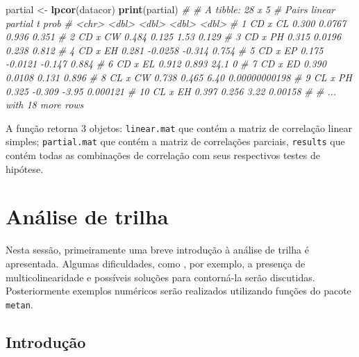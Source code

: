 \documentclass[
]{book}
\newenvironment{Shaded}{\begin{snugshade}}{\end{snugshade}}
\newcommand{\CommentTok}[1]{\textcolor[rgb]{0.56,0.35,0.01}{\textit{#1}}}
\newcommand{\KeywordTok}[1]{\textcolor[rgb]{0.13,0.29,0.53}{\textbf{#1}}}
\newcommand{\NormalTok}[1]{#1}
\newcommand{\StringTok}[1]{\textcolor[rgb]{0.31,0.60,0.02}{#1}}
\begin{document}
\begin{Shaded}
\begin{Highlighting}[]

\NormalTok{partial <-}\StringTok{ }\KeywordTok{lpcor}\NormalTok{(datacor)}
\KeywordTok{print}\NormalTok{(partial)}
\CommentTok{# # A tibble: 28 x 5}
\CommentTok{#    Pairs   linear partial      t          prob}
\CommentTok{#    <chr>    <dbl>   <dbl>  <dbl>         <dbl>}
\CommentTok{#  1 CD x CL  0.300  0.0767  0.936 0.351        }
\CommentTok{#  2 CD x CW  0.484  0.125   1.53  0.129        }
\CommentTok{#  3 CD x PH  0.315  0.0196  0.238 0.812        }
\CommentTok{#  4 CD x EH  0.281 -0.0258 -0.314 0.754        }
\CommentTok{#  5 CD x EP  0.175 -0.0121 -0.147 0.884        }
\CommentTok{#  6 CD x EL  0.912  0.893  24.1   0            }
\CommentTok{#  7 CD x ED  0.390  0.0108  0.131 0.896        }
\CommentTok{#  8 CL x CW  0.738  0.465   6.40  0.00000000198}
\CommentTok{#  9 CL x PH  0.325 -0.309  -3.95  0.000121     }
\CommentTok{# 10 CL x EH  0.397  0.256   3.22  0.00158      }
\CommentTok{# # ... with 18 more rows}
\end{Highlighting}
\end{Shaded}

A função retorna 3 objetos: \texttt{linear.mat} que contém a matriz de correlação linear simples; \texttt{partial.mat} que contém a matriz de correlações parciais, \texttt{results} que contém todas as combinações de correlação com seus respectivos testes de hipótese.

\hypertarget{anuxe1lise-de-trilha}{%
\section{Análise de trilha}\label{anuxe1lise-de-trilha}}

Nesta sessão, primeiramente uma breve introdução à análise de trilha é apresentada. Algumas dificuldades, como , por exemplo, a presença de multicolinearidade  e possíveis soluções para contorná-la serão discutidas. Posteriormente exemplos numéricos serão realizados utilizando funções do pacote \texttt{metan}.

\hypertarget{introduuxe7uxe3o}{%
\subsection{Introdução}\label{introduuxe7uxe3o}}
\end{document}
